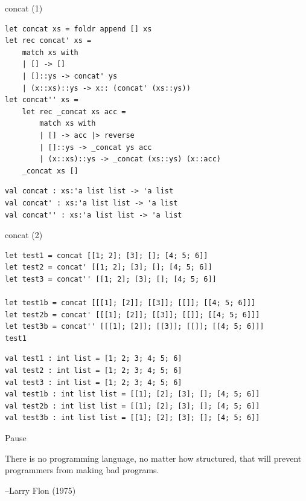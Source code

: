 \documentclass[t]{beamer}
\begin{document}
\begin{frame}[label={sec:org6c217f9},fragile]{concat (1)}
 \begin{verbatim}
let concat xs = foldr append [] xs
let rec concat' xs = 
    match xs with
    | [] -> []
    | []::ys -> concat' ys
    | (x::xs)::ys -> x:: (concat' (xs::ys))
let concat'' xs =
    let rec _concat xs acc = 
        match xs with
        | [] -> acc |> reverse
        | []::ys -> _concat ys acc
        | (x::xs)::ys -> _concat (xs::ys) (x::acc)
    _concat xs []
\end{verbatim}

\begin{verbatim}
val concat : xs:'a list list -> 'a list
val concat' : xs:'a list list -> 'a list
val concat'' : xs:'a list list -> 'a list
\end{verbatim}
\end{frame}

\begin{frame}[label={sec:orgb8c7408},fragile]{concat (2)}
 \begin{verbatim}
let test1 = concat [[1; 2]; [3]; []; [4; 5; 6]]
let test2 = concat' [[1; 2]; [3]; []; [4; 5; 6]]
let test3 = concat'' [[1; 2]; [3]; []; [4; 5; 6]]

let test1b = concat [[[1]; [2]]; [[3]]; [[]]; [[4; 5; 6]]]
let test2b = concat' [[[1]; [2]]; [[3]]; [[]]; [[4; 5; 6]]] 
let test3b = concat'' [[[1]; [2]]; [[3]]; [[]]; [[4; 5; 6]]] 
test1
\end{verbatim}

\begin{verbatim}
val test1 : int list = [1; 2; 3; 4; 5; 6]
val test2 : int list = [1; 2; 3; 4; 5; 6]
val test3 : int list = [1; 2; 3; 4; 5; 6]
val test1b : int list list = [[1]; [2]; [3]; []; [4; 5; 6]]
val test2b : int list list = [[1]; [2]; [3]; []; [4; 5; 6]]
val test3b : int list list = [[1]; [2]; [3]; []; [4; 5; 6]]
\end{verbatim}
\end{frame}

\begin{frame}[label={sec:org8f85440}]{Pause}
\begin{block}{}
There is no programming language, no matter how structured, 
that will prevent programmers from making bad programs.

\null\hfill--Larry Flon (1975)
\end{block}
\end{frame}
\end{document}
